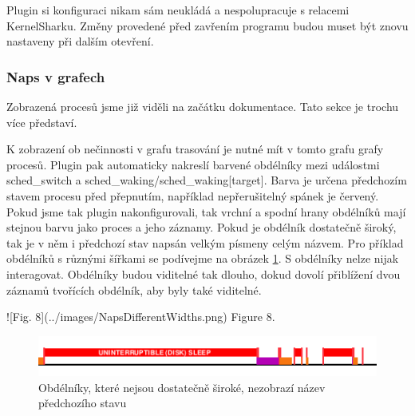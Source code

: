Plugin si konfiguraci nikam sám neukládá a nespolupracuje s relacemi KernelSharku. Změny provedené před zavřením programu budou muset být znovu nastaveny při dalším otevření.

\subsubsection{Naps v grafech}

Zobrazená  procesů jsme již viděli na začátku dokumentace. Tato sekce je trochu více představí.

K zobrazení ob nečinnosti v grafu trasování je nutné mít v tomto grafu grafy procesů. Plugin pak automaticky nakreslí barvené obdélníky mezi událostmi sched\_switch a sched\_waking/sched\_waking[target]. Barva je určena předchozím stavem procesu před přepnutím, například nepřerušitelný spánek je červený. Pokud jsme tak plugin nakonfigurovali, tak vrchní a spodní hrany obdélníků mají stejnou barvu jako proces a jeho záznamy. Pokud je obdélník dostatečně široký, tak je v něm i předchozí stav napsán velkým písmeny celým názvem. Pro příklad obdélníků s různými šířkami se podívejme na obrázek \ref{nap-diff-widths}. S obdélníky nelze nijak interagovat. Obdélníky budou viditelné tak dlouho, dokud dovolí přiblížení dvou záznamů tvořících obdélník, aby byly také viditelné.

![Fig. 8](../images/NapsDifferentWidths.png)
Figure 8.
\begin{figure}[p]\centering
    \includegraphics[width=140mm]{img/Naps/NapsDifferentWidths}
    \caption{Obdélníky, které nejsou dostatečně široké, nezobrazí název předchozího stavu}
    \label{nap-diff-widths}
\end{figure}

